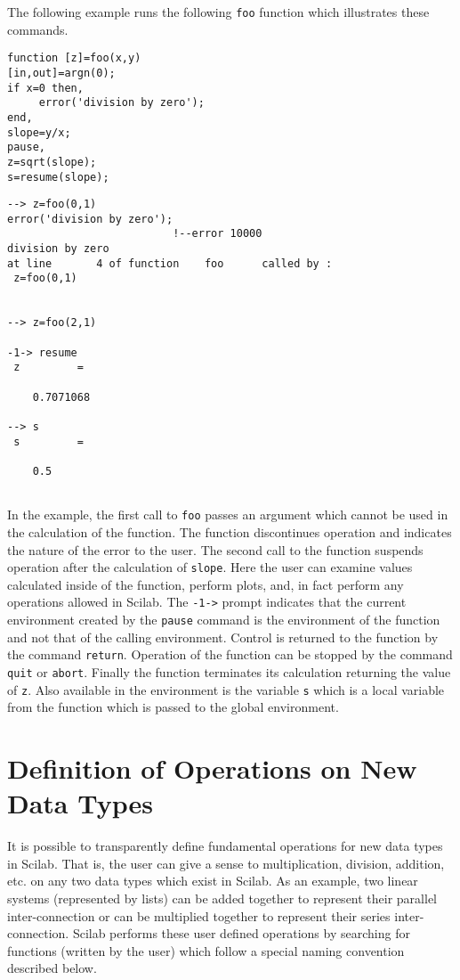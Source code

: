 The following example runs the following {\tt foo} function which
illustrates these commands.
\begin{verbatim}
function [z]=foo(x,y)
[in,out]=argn(0);
if x=0 then,
     error('division by zero');
end,
slope=y/x;
pause,
z=sqrt(slope);
s=resume(slope);
\end{verbatim}
\begin{verbatim} 
--> z=foo(0,1)
error('division by zero');
                          !--error 10000 
division by zero                                                                
at line       4 of function    foo      called by :  
 z=foo(0,1)
 
 
--> z=foo(2,1)
 
-1-> resume
 z         =
 
    0.7071068  
 
--> s
 s         =
 
    0.5  
 
\end{verbatim}
In the example, the first call to {\tt foo} passes an argument which cannot
be used in the calculation of the function.  The function discontinues
operation and indicates the nature of the error to the user.  The second call
to the function suspends operation after the calculation of {\tt slope}.
Here the user can examine values calculated inside of the function,
perform plots, and, in fact perform any operations 
allowed in Scilab.  The {\tt -1->} prompt indicates that the current
environment created by the {\tt pause} command is the environment 
of the function and not that of the calling environment.  Control is 
returned to the function by the command {\tt return}.  Operation of the
function can be stopped by the command {\tt quit} or {\tt abort}.
Finally the function terminates its calculation returning the
value of {\tt z}.  Also available in the environment is the variable
{\tt s} which is a local variable from the function which is passed to
the global environment.

\section{Definition of Operations on New Data Types}
\label{s4.3}

	It is possible to transparently define fundamental operations 
for new data types in Scilab.
That is, the user can give a sense to multiplication, division, addition, etc.
on any two data types which exist in Scilab.  As an example, two linear
systems (represented by lists)
can be added together to represent their parallel inter-connection
or can be multiplied together to represent their series inter-connection.
Scilab performs these user defined operations by searching for functions
(written by the user) which follow a special naming convention described
below.


